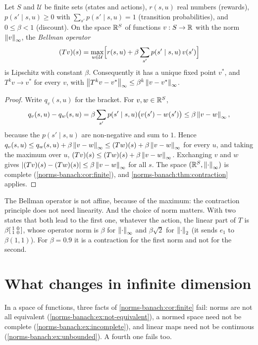 \begin{notechapter}
\begin{proposition}
\label{norms-banach:prop:bellman}
Let $S$ and $\mathcal U$ be finite sets (states and actions), $r(s, u)$
real numbers (rewards), $p(s'\mid s, u)\geq0$ with
$\sum_{s'}p(s'\mid s, u) = 1$ (transition probabilities), and
$0\leq\beta < 1$ (discount). On the space $\mathbb{R}^S$ of functions
$v:S\to\mathbb{R}$ with the norm $\left\|v\right\|_\infty$, the \emph{Bellman operator}
\[
  (Tv)(s) = \max_{u\in\mathcal U}
  \Bigl[r(s, u) + \beta\sum_{s'}p(s'\mid s, u)\,v(s')\Bigr]
\]
is Lipschitz with constant $\beta$. Consequently it has a unique fixed
point $v^*$, and $T^kv\to v^*$ for every $v$, with
$\left\|T^kv - v^*\right\|_\infty\leq\beta^k\left\|v - v^*\right\|_\infty$.
\end{proposition}

\begin{proof}
Write $q_v(s, u)$ for the bracket. For $v, w\in\mathbb{R}^S$,
\[
  q_v(s, u) - q_w(s, u) = \beta\sum_{s'}p(s'\mid s, u)\bigl(v(s') -
  w(s')\bigr)\leq\beta\left\|v - w\right\|_\infty ,
\]
because the $p(s'\mid s, u)$ are non-negative and sum to $1$. Hence
$q_v(s, u)\leq q_w(s, u) + \beta\left\|v - w\right\|_\infty
\leq(Tw)(s) + \beta\left\|v - w\right\|_\infty$ for every $u$, and taking the
maximum over $u$, $(Tv)(s)\leq(Tw)(s) + \beta\left\|v - w\right\|_\infty$.
Exchanging $v$ and $w$ gives
$\left|(Tv)(s) - (Tw)(s)\right|\leq\beta\left\|v - w\right\|_\infty$ for all $s$. The
space $(\mathbb{R}^S, \left\|\cdot\right\|_\infty)$ is complete
(\cref{norms-banach:cor:finite}), and
\cref{norms-banach:thm:contraction} applies.
\end{proof}

The Bellman operator is not affine, because of the maximum: the
contraction principle does not need linearity. And the choice of norm
matters. With two states that both lead to the first one, whatever the
action, the linear part of $T$ is
$\beta\begin{bsmallmatrix}1 & 0\\1 & 0\end{bsmallmatrix}$, whose operator
norm is $\beta$ for $\left\|\cdot\right\|_\infty$ and $\beta\sqrt2$ for
$\left\|\cdot\right\|_2$ (it sends $e_1$ to $\beta(1, 1)$). For $\beta = 0.9$ it is
a contraction for the first norm and not for the second.

\section{What changes in infinite dimension}
\label{norms-banach:sec:infinite}

In a space of functions, three facts of \cref{norms-banach:cor:finite}
fail: norms are not all equivalent
(\cref{norms-banach:ex:not-equivalent}), a normed space need not be
complete (\cref{norms-banach:ex:incomplete}), and linear maps need not be
continuous (\cref{norms-banach:ex:unbounded}). A fourth one fails too.


\end{notechapter}
